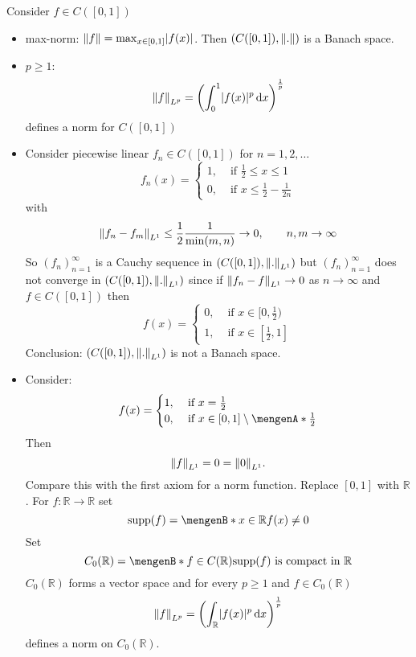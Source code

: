 Consider $ f \in C([0,1])$
\begin{itemize}
	\item max-norm: $\norm{f} = \max_{x \in [0,1]}\abs{f(x)}$. Then $(C([0,1]),\norm{.})$ is a Banach space.
	\item $p \geq 1:$
	\[
		\norm{f}_{L^p} = \left( \int_{0}^{1}\abs{f(x)}^p \,\mathrm{d}x \right)^{\frac{1}{p}} 
	\]
	defines a norm for $C([0,1])$
\end{itemize}
\begin{bemerkung}
	\begin{itemize}
		\item Consider piecewise linear $f_n \in C([0,1])$ for $n =1,2, \dots$
		\[
			f_n(x) = \begin{cases}
				1, &\text{ if } \frac{1}{2} \leq x \leq 1 \\
				0, &\text{ if } x \leq \frac{1}{2} - \frac{1}{2n}
			\end{cases}
		\]
		with
		\[
			\norm{f_n-f_m}_{L^1} \leq \frac{1}{2} \frac{1}{\min(m,n)} \to 0, \qquad n,m \to \infty
		\]
		So $(f_n)_{n=1}^{\infty}$ is a Cauchy sequence in $(C([0,1]),\norm{.}_{L^1})$ but $(f_n)_{n=1}^{\infty}$ does not converge in $(C([0,1]),\norm{.}_{L^1})$ since
		if $\norm{f_n - f}_{L^1} \to 0$ as $n \to \infty$ and $f \in C([0,1])$ then
		\[
			f(x) = \begin{cases}
				0, &\text{ if }x \in [0,\frac{1}{2})\\
				1, &\text{ if }x \in [\frac{1}{2},1]
			\end{cases}
		\]
		Conclusion: $(C([0,1]), \norm{.}_{L^1})$ is not a Banach space.
		\item Consider:
		\[
			f(x) = \begin{cases}
				1, &\text{ if }x = \frac{1}{2}\\
				0, &\text{ if }x \in [0,1] \setminus \set{\frac{1}{2}}
			\end{cases}
		\]
		Then
		\[
			\norm{f}_{L^1} = 0 = \norm{0}_{L^1}.
		\]
		Compare this with the first axiom for a norm function. Replace $[0,1]$ with $\mathbb{R}$. For $f : \mathbb{R} \to \mathbb{R}$ set \[
			\supp(f) = \set[x \in \mathbb{R}]{f(x) \neq 0}
		\]
		Set 
		\[
			C_0(\mathbb{R}) = \set[f \in C(\mathbb{R})]{ \supp(f) \text{ is compact in }\mathbb{R}}
		\]
		 $C_0(\mathbb{R})$ forms a vector space and for every $p \geq 1$ and $f \in C_0(\mathbb{R})$
		\[
			\norm{f}_{L^p} = \left( \int_{\mathbb{R}}^{} \abs{f(x)}^p \,\mathrm{d}x \right)^{\frac{1}{p}}
		\] defines a norm on $C_0(\mathbb{R})$. \\

\end{itemize}
\end{bemerkung}
